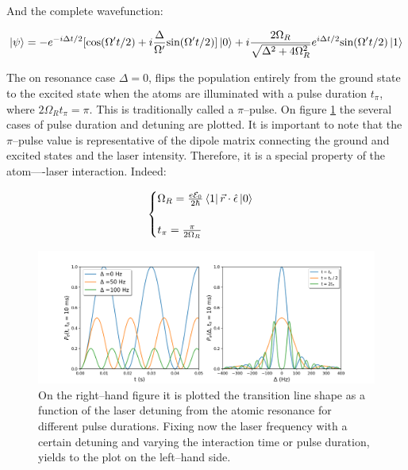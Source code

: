 And the complete wavefunction:

\begin{equation}
    \ket{\psi} = - e^{-i\Delta t/2}[\textrm{cos}(\Omega't/2) + i \frac{\Delta}{\Omega'} \textrm{sin}(\Omega' t /2)] \ket{0} + i \frac{2\Omega_{R}}{\sqrt{\Delta ^{2} + 4\Omega_{R}^{2}}} e^{i\Delta t / 2} \textrm{sin}(\Omega' t / 2) \ket{1}
\end{equation}

The on resonance case $\Delta=0$, flips the population entirely from the ground state to the excited state when the atoms are illuminated with a pulse duration $t_{\pi}$, where $2\Omega_{R}t_{\pi} = \pi$. This is traditionally called a $\pi$--pulse. On figure \ref{rabi_osc} the several cases of pulse duration and detuning are plotted. It is important to note that the $\pi$--pulse value is representative of the dipole matrix connecting the ground and excited states and the laser intensity. Therefore, it is a special property of the atom----laser interaction. Indeed:

\begin{equation}
    \begin{cases}
        \Omega_{R} = \frac{e\mathcal{E}_{0}}{2\hbar} \bra{1} \vec{r} \cdot \hat{\epsilon} \ket{0} \\
        \\
        t_{\pi} = \frac{\pi}{2\Omega_{R}}
    \end{cases}
\end{equation}

\begin{figure}[h]
\centering
\includegraphics[width=\linewidth]{./plots/Rabi_Oscillations/rabi.png}
\caption{On the right--hand figure it is plotted the transition line shape as a function of the laser detuning from the atomic resonance for different pulse durations. Fixing now the laser frequency with a certain detuning and varying the interaction time or pulse duration, yields to the plot on the left--hand side.}
\label{rabi_osc}
\end{figure}


